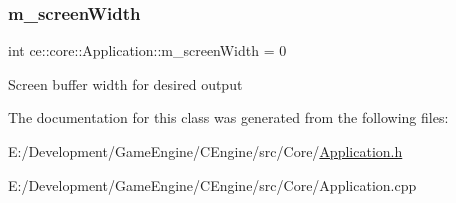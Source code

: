 \subsubsection{\texorpdfstring{m\+\_\+screen\+Width}{m\_screenWidth}}
{\footnotesize\ttfamily int ce\+::core\+::\+Application\+::m\+\_\+screen\+Width = 0\hspace{0.3cm}{\ttfamily [protected]}}

Screen buffer width for desired output 

The documentation for this class was generated from the following files\+:\begin{DoxyCompactItemize}
\item 
E\+:/\+Development/\+Game\+Engine/\+C\+Engine/src/\+Core/\hyperlink{_application_8h}{Application.\+h}\item 
E\+:/\+Development/\+Game\+Engine/\+C\+Engine/src/\+Core/Application.\+cpp\end{DoxyCompactItemize}
